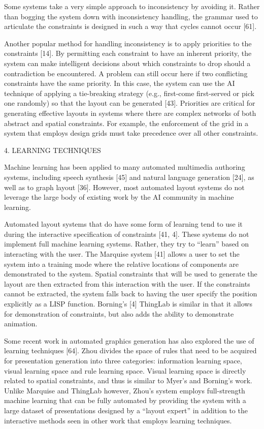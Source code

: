     Some systems take a very simple approach to inconsistency by avoiding it. Rather than bogging the system down with inconsistency handling, the grammar used to articulate the constraints is designed in such a way that cycles cannot occur [61].

    Another popular method for handling inconsistency is to apply priorities to the constraints [14]. By permitting each constraint to have an inherent priority, the system can make intelligent decisions about which constraints to drop should a contradiction be encountered. A problem can still occur here if two conflicting constraints have the same priority. In this case, the system can use the AI technique of applying a tie-breaking strategy (e.g., first-come first-served or pick one randomly) so that the layout can be generated [43]. Priorities are critical for generating effective layouts in systems where there are complex networks of both abstract and spatial constraints. For example, the enforcement of the grid in a system that employs design grids must take precedence over all other constraints.

    4. LEARNING TECHNIQUES

    Machine learning has been applied to many automated multimedia authoring systems, including speech synthesis [45] and natural language generation [24], as well as to graph layout [36]. However, most automated layout systems do not leverage the large body of existing work by the AI community in machine learning.

    Automated layout systems that do have some form of learning tend to use it during the interactive specification of constraints [41, 4]. These systems do not implement full machine learning systems. Rather, they try to “learn” based on interacting with the user. The Marquise system [41] allows a user to set the system into a training mode where the relative locations of components are demonstrated to the system. Spatial constraints that will be used to generate the layout are then extracted from this interaction with the user. If the constraints cannot be extracted, the system falls back to having the user specify the position explicitly as a LISP function. Borning’s [4] ThingLab is similar in that it allows for demonstration of constraints, but also adds the ability to demonstrate animation.

    Some recent work in automated graphics generation has also explored the use of learning techniques [64]. Zhou divides the space of rules that need to be acquired for presentation generation into three categories: information learning space, visual learning space and rule learning space. Visual learning space is directly related to spatial constraints, and thus is similar to Myer’s and Borning’s work. Unlike Marquise and ThingLab however, Zhou’s system employs full-strength machine learning that can be fully automated by providing the system with a large dataset of presentations designed by a “layout expert” in addition to the interactive methods seen in other work that employs learning techniques.

